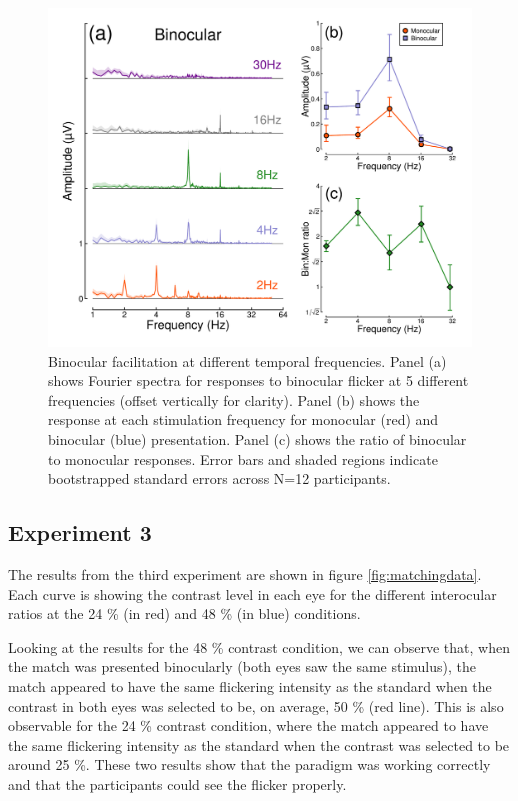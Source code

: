 \documentclass[
]{article}
\begin{document}
\begin{figure}

{\centering \includegraphics{Figures/TFdata} 

}

\caption{Binocular facilitation at different temporal frequencies. Panel (a) shows Fourier spectra for responses to binocular flicker at 5 different frequencies (offset vertically for clarity). Panel (b) shows the response at each stimulation frequency for monocular (red) and binocular (blue) presentation. Panel (c) shows the ratio of binocular to monocular responses. Error bars and shaded regions indicate bootstrapped standard errors across N=12 participants.}\label{fig:TFdata}
\end{figure}

\hypertarget{experiment-3-1}{%
\subsection{Experiment 3}\label{experiment-3-1}}

The results from the third experiment are shown in figure \ref{fig:matchingdata}. Each curve is showing the contrast level in each eye for the different interocular ratios at the 24 \% (in red) and 48 \% (in blue) conditions.

Looking at the results for the 48 \% contrast condition, we can observe that, when the match was presented binocularly (both eyes saw the same stimulus), the match appeared to have the same flickering intensity as the standard when the contrast in both eyes was selected to be, on average, 50 \% (red line). This is also observable for the 24 \% contrast condition, where the match appeared to have the same flickering intensity as the standard when the contrast was selected to be around 25 \%. These two results show that the paradigm was working correctly and that the participants could see the flicker properly.
\end{document}
